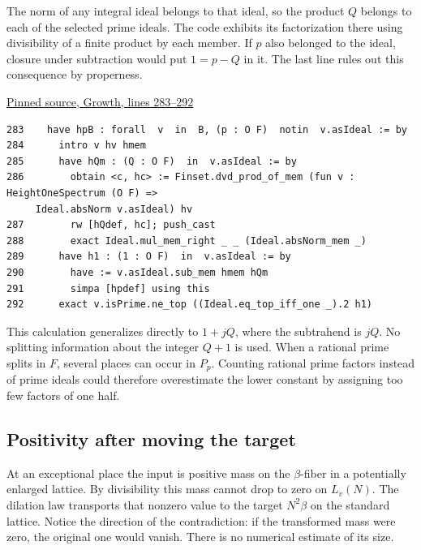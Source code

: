 \documentclass[12pt,letterpaper]{article}
\begin{document}
The norm of any integral ideal belongs to that ideal, so the product \(Q\) belongs to each of the selected prime ideals. The code exhibits its factorization there using divisibility of a finite product by each member. If \(p\) also belonged to the ideal, closure under subtraction would put \(1=p-Q\) in it. The last line rules out this consequence by properness.

\par\smallskip\href{https://github.com/nousentllc/riemann-hypothesis/blob/40e56bab026552e089d7afcfeff08d2defb9c005/src/CompanionTheory/SpectralGeometry/LocalGlobalProofs/AdelicAnalysis/RankOneLocalDensitiesProductConverges.lean#L283-L292}{\sffamily\small Pinned source, Growth, lines 283--292}\par

{\footnotesize\begin{verbatim}
283    have hpB : forall  v  in  B, (p : O F)  notin  v.asIdeal := by
284      intro v hv hmem
285      have hQm : (Q : O F)  in  v.asIdeal := by
286        obtain <c, hc> := Finset.dvd_prod_of_mem (fun v : HeightOneSpectrum (O F) =>
     Ideal.absNorm v.asIdeal) hv
287        rw [hQdef, hc]; push_cast
288        exact Ideal.mul_mem_right _ _ (Ideal.absNorm_mem _)
289      have h1 : (1 : O F)  in  v.asIdeal := by
290        have := v.asIdeal.sub_mem hmem hQm
291        simpa [hpdef] using this
292      exact v.isPrime.ne_top ((Ideal.eq_top_iff_one _).2 h1)
\end{verbatim}
}

This calculation generalizes directly to \(1+jQ\), where the subtrahend is \(jQ\). No splitting information about the integer \(Q+1\) is used. When a rational prime splits in \(F\), several places can occur in \(P_p\). Counting rational prime factors instead of prime ideals could therefore overestimate the lower constant by assigning too few factors of one half.

\clearpage\subsection*{Positivity after moving the target}

At an exceptional place the input is positive mass on the \(\beta\)-fiber in a potentially enlarged lattice. By divisibility this mass cannot drop to zero on \(L_v(N)\). The dilation law transports that nonzero value to the target \(N^2\beta\) on the standard lattice. Notice the direction of the contradiction: if the transformed mass were zero, the original one would vanish. There is no numerical estimate of its size.
\end{document}
